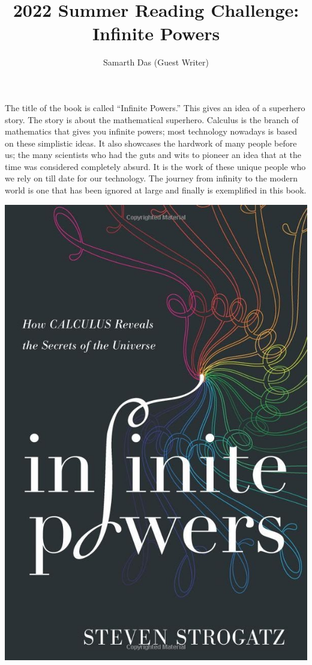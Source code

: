 \title{2022 Summer Reading Challenge: Infinite Powers}
\author{Samarth Das (Guest Writer)}


The title of the book is called “Infinite Powers.” This gives an idea of a superhero story. The
story is about the mathematical superhero. Calculus is the branch of mathematics that gives you
infinite powers; most technology nowadays is based on these simplistic ideas. It also showcases
the hardwork of many people before us; the many scientists who had the guts and wits to
pioneer an idea that at the time was considered completely absurd. It is the work of these
unique people who we rely on till date for our technology. The journey from infinity to the modern
world is one that has been ignored at large and finally is exemplified in this book.

\begin{center}
   \includegraphics{images/infinity_powers.jpg}
\end{center}

